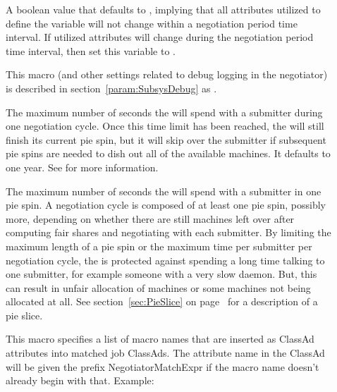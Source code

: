 \begin{description}
\item[]
  \label{param:PreemptionRankStable}
  A boolean value that defaults to , implying that all attributes
  utilized to define the  variable will not
  change within a negotiation period time interval.
  If utilized attributes will change during the 
  negotiation period time interval, then set this variable to .

\item[] \label{param:NegotiatorDebug} This macro
  (and other settings related to debug logging in the negotiator) is
  described in section~\ref{param:SubsysDebug} as .

\item[]
  \label{param:NegotiatorMaxTimePerSubmitter} The maximum number of seconds
  the  will spend with a submitter during one
  negotiation cycle.  Once this time limit has been reached, the
   will still finish its current pie spin, but it will skip
  over the submitter if subsequent pie spins are needed to dish out all
  of the available machines.  It defaults to one year.  See
   for more information.

\item[]
  \label{param:NegotiatorMaxTimePerPieSpin} The maximum number of seconds the
   will spend with a submitter in one pie spin.
  A negotiation cycle is composed of at least one pie spin, possibly more,
  depending on whether there are still machines left over after
  computing fair shares and negotiating with each submitter.  By
  limiting the maximum length of a pie spin or the maximum time per
  submitter per negotiation cycle, the  is protected
  against spending a long time talking to one submitter, for example someone
  with a very slow  daemon.
  But, this can result in unfair allocation of
  machines or some machines not being allocated at all.
  See section~\ref{sec:PieSlice} on page~\pageref{sec:PieSlice}
  for a description of a pie slice.

\item[]
\label{param:NegotiatorMatchExprs} This macro specifies a list of macro names
that are inserted as ClassAd attributes into matched job ClassAds.
The attribute name in the ClassAd will be given the prefix
NegotiatorMatchExpr if the macro name doesn't already begin with that.
Example:


\end{description}
